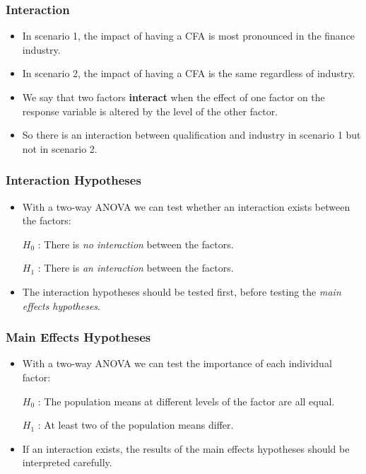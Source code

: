 \documentclass[12pt]{beamer}
\begin{document}
\begin{frame}
	\frametitle{Interaction}
	
	\begin{itemize}[label={\color{blue}$\blacktriangleright$}]
		\item In scenario 1, the impact of having a CFA is most pronounced in the finance industry.
		
		\item In scenario 2, the impact of having a CFA is the same regardless of industry.
		
		\item We say that two factors \textbf{interact} when the effect of one factor on the response variable is altered by the level of the other factor.
		
		\item So there is an interaction between qualification and industry in scenario 1 but not in scenario 2.
	\end{itemize}
	
\end{frame}
\begin{frame}
	\frametitle{Interaction Hypotheses}
	
	\begin{itemize}[label={\color{blue}$\blacktriangleright$}]
		\item With a two-way ANOVA we can test whether an interaction exists between the factors:
		
		\vspace{0.3cm}
		$H_0$ : There is \textit{no interaction} between the factors.
		
		\vspace{0.2cm}
		$H_1$ : There is \textit{an interaction} between the factors.
		
		\item The interaction hypotheses should be tested first, before testing the \textit{main effects hypotheses}.
	\end{itemize}
	
\end{frame}
\begin{frame}
	\frametitle{Main Effects Hypotheses}
	
	\begin{itemize}[label={\color{blue}$\blacktriangleright$}]
		\item With a two-way ANOVA we can test the importance of each individual factor:
		
		\vspace{0.3cm}
		$H_0$ : The population means at different levels of the factor are all equal.
		
		\vspace{0.2cm}
		$H_1$ : At least two of the population means differ.
		
		\item If an interaction exists, the results of the main effects hypotheses should be interpreted carefully.
	\end{itemize}
	
\end{frame}
\end{document}
